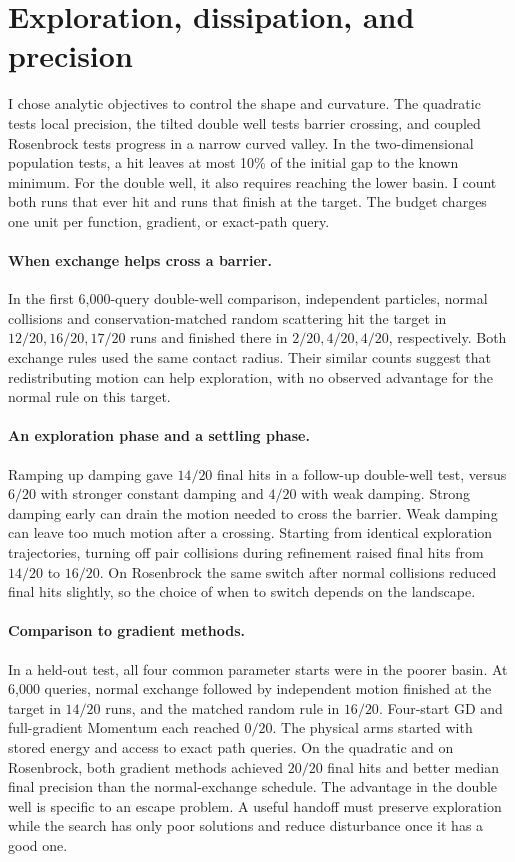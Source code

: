 \documentclass[10pt,letterpaper]{article}
\begin{document}
\section{Exploration, dissipation, and precision}

I chose analytic objectives to control the shape and curvature. The quadratic tests local precision, the tilted double well tests barrier crossing, and coupled Rosenbrock tests progress in a narrow curved valley. In the two-dimensional population tests, a hit leaves at most 10\% of the initial gap to the known minimum. For the double well, it also requires reaching the lower basin. I count both runs that ever hit and runs that finish at the target. The budget charges one unit per function, gradient, or exact-path query.

\paragraph{When exchange helps cross a barrier.}
In the first 6,000-query double-well comparison, independent particles, normal collisions and conservation-matched random scattering hit the target in \(12/20,16/20,17/20\) runs and finished there in \(2/20,4/20,4/20\), respectively. Both exchange rules used the same contact radius. Their similar counts suggest that redistributing motion can help exploration, with no observed advantage for the normal rule on this target.

\paragraph{An exploration phase and a settling phase.}
Ramping up damping gave \(14/20\) final hits in a follow-up double-well test, versus \(6/20\) with stronger constant damping and \(4/20\) with weak damping. Strong damping early can drain the motion needed to cross the barrier. Weak damping can leave too much motion after a crossing. Starting from identical exploration trajectories, turning off pair collisions during refinement raised final hits from \(14/20\) to \(16/20\). On Rosenbrock the same switch after normal collisions reduced final hits slightly, so the choice of when to switch depends on the landscape.

\paragraph{Comparison to gradient methods.}
In a held-out test, all four common parameter starts were in the poorer basin. At 6,000 queries, normal exchange followed by independent motion finished at the target in \(14/20\) runs, and the matched random rule in \(16/20\). Four-start GD and full-gradient Momentum each reached \(0/20\). The physical arms started with stored energy and access to exact path queries. On the quadratic and on Rosenbrock, both gradient methods achieved \(20/20\) final hits and better median final precision than the normal-exchange schedule. The advantage in the double well is specific to an escape problem. A useful handoff must preserve exploration while the search has only poor solutions and reduce disturbance once it has a good one.
\end{document}
